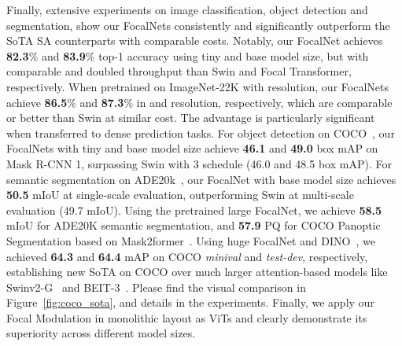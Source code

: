 \documentclass{article}
\begin{document}
Finally, extensive experiments on image classification, object detection and segmentation, show our FocalNets consistently and significantly outperform the SoTA SA counterparts with comparable costs. Notably, our FocalNet achieves \textbf{82.3}\% and \textbf{83.9}\% top-1 accuracy using tiny and base model size, but with comparable and doubled throughput than Swin and Focal Transformer, respectively. When pretrained on ImageNet-22K with  resolution, our FocalNets achieve \textbf{86.5}\% and \textbf{87.3}\% in  and  resolution, respectively, which are comparable or better than Swin at similar cost. The advantage is particularly significant when transferred to dense prediction tasks. For object detection on COCO~\cite{lin2014microsoft}, our FocalNets with tiny and base model size achieve \textbf{46.1} and \textbf{49.0} box mAP on Mask R-CNN 1, surpassing Swin with 3 schedule ({46.0} and {48.5} box mAP). For semantic segmentation on ADE20k~\cite{zhou2017scene}, our FocalNet with base model size achieves \textbf{50.5} mIoU at single-scale evaluation, outperforming Swin at multi-scale evaluation ({49.7} mIoU). Using the pretrained large FocalNet, we achieve \textbf{58.5} mIoU for ADE20K semantic segmentation, and \textbf{57.9} PQ for COCO Panoptic Segmentation based on Mask2former~\cite{cheng2021masked}. Using huge FocalNet and DINO~\cite{zhang2022dino}, we achieved \textbf{64.3} and \textbf{64.4} mAP on COCO \textit{minival} and \textit{test-dev}, respectively, establishing new SoTA on COCO over much larger attention-based models like Swinv2-G~\cite{liu2022swin} and BEIT-3~\cite{wang2022image}. Please find the visual comparison in Figure~\ref{fig:coco_sota}, and details in the experiments. Finally, we apply our Focal Modulation in monolithic layout as ViTs and clearly demonstrate its superiority across different model sizes. 
\end{document}
